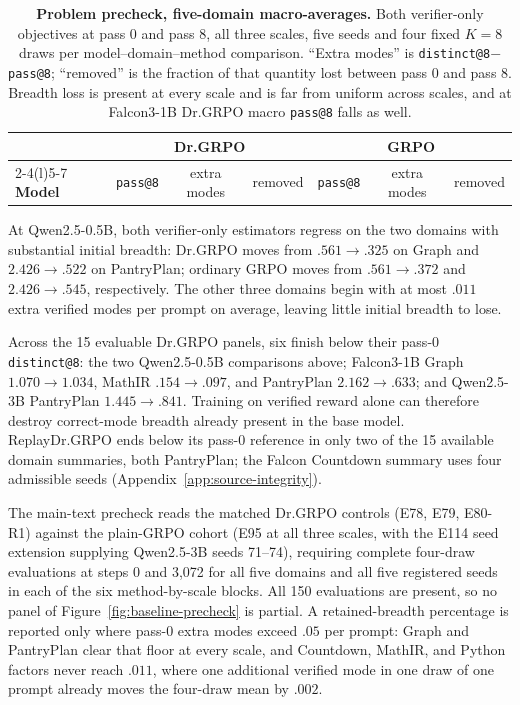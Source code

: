 \begin{table}[ht]
  \centering
  \caption{\textbf{Problem precheck, five-domain macro-averages.} Both
  verifier-only objectives at pass 0 and pass 8, all three scales, five seeds
  and four fixed $K=8$ draws per model--domain--method comparison. ``Extra modes'' is
  \texttt{distinct@8}$-$\texttt{pass@8}; ``removed'' is the fraction of that
  quantity lost between pass 0 and pass 8. Breadth loss is present at every
  scale and is far from uniform across scales, and at Falcon3-1B Dr.GRPO
  macro \texttt{pass@8} falls as well.}
  \label{tab:baseline-collapse-precheck}
  \small
  \setlength{\tabcolsep}{4.5pt}
  \begin{tabular}{@{}l*{6}{c}@{}}
    \toprule
    & \multicolumn{3}{c}{\textbf{Dr.GRPO}} & \multicolumn{3}{c}{\textbf{GRPO}} \\
    \cmidrule(lr){2-4}\cmidrule(l){5-7}
    \textbf{Model} & \texttt{pass@8} & extra modes & removed
                   & \texttt{pass@8} & extra modes & removed \\
    \midrule
    
  \end{tabular}
\end{table}

At Qwen2.5-0.5B, both verifier-only
estimators regress on the two domains with substantial initial breadth:
Dr.GRPO moves from $.561\to.325$ on Graph and $2.426\to.522$ on PantryPlan;
ordinary GRPO moves from $.561\to.372$ and $2.426\to.545$, respectively.
The other three domains begin with at most $.011$ extra verified modes per
prompt on average, leaving little initial breadth to lose.

Across the 15 evaluable Dr.GRPO panels, six finish below their pass-0
\texttt{distinct@8}: the two Qwen2.5-0.5B comparisons above; Falcon3-1B Graph
$1.070\to1.034$, MathIR $.154\to.097$, and PantryPlan $2.162\to.633$; and
Qwen2.5-3B PantryPlan $1.445\to.841$. Training on verified reward alone can
therefore destroy correct-mode breadth already present in the base model.
ReplayDr.GRPO ends below its pass-0 reference in only two of the 15 available
domain summaries, both PantryPlan; the Falcon Countdown summary uses four
admissible seeds (Appendix~\ref{app:source-integrity}).

The main-text precheck reads the matched Dr.GRPO controls (E78, E79,
E80-R1) against the plain-GRPO cohort (E95 at all three scales, with the E114
seed extension supplying Qwen2.5-3B seeds 71--74), requiring complete four-draw
evaluations at steps 0 and 3,072 for all five domains and all five registered
seeds in each of the six method-by-scale blocks. All 150 evaluations are present, so no
panel of Figure~\ref{fig:baseline-precheck} is partial. A retained-breadth
percentage is reported only where pass-0 extra modes exceed $.05$ per prompt:
Graph and PantryPlan clear that floor at every scale, and Countdown, MathIR,
and Python factors never reach $.011$, where one additional verified mode in
one draw of one prompt already moves the four-draw mean by $.002$.

